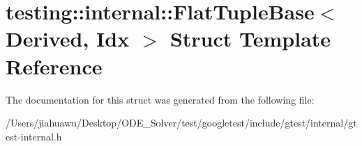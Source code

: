 \hypertarget{structtesting_1_1internal_1_1_flat_tuple_base}{}\section{testing\+:\+:internal\+:\+:Flat\+Tuple\+Base$<$ Derived, Idx $>$ Struct Template Reference}
\label{structtesting_1_1internal_1_1_flat_tuple_base}


The documentation for this struct was generated from the following file\+:\begin{DoxyCompactItemize}
\item 
/\+Users/jiahuawu/\+Desktop/\+O\+D\+E\+\_\+\+Solver/test/googletest/include/gtest/internal/gtest-\/internal.\+h\end{DoxyCompactItemize}
